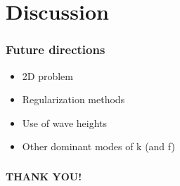 \documentclass[7pt]{beamer}
\begin{document}
\section{Discussion}
\begin{frame}
 \frametitle{Future directions}
 \begin{itemize}
 \item 2D problem
 \item Regularization methods
 \item Use of wave heights
 \item Other dominant modes of k (and f)
 \end{itemize}

\end{frame}
\begin{frame}
\frametitle{}
\hspace{2.5cm}
\begin{minipage}{50mm}   
                                                                                                                           
      \begin{alertblock}{}    
                                          
            \begin{center}
                                                                                                                                                                                  
                  \textbf{THANK YOU!}
                            
                                                                       
            \end{center}
      \end{alertblock}
\end{minipage}
\end{frame}
\end{document}
